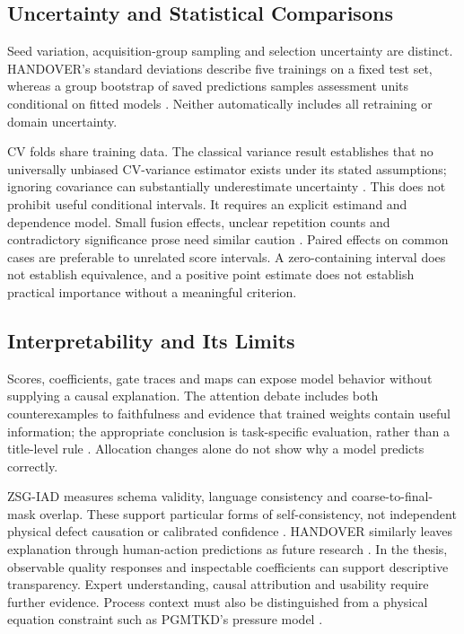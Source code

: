 \subsection{Uncertainty and Statistical Comparisons}
Seed variation, acquisition-group sampling and selection uncertainty are distinct. HANDOVER's standard deviations describe five trainings on a fixed test set, whereas a group bootstrap of saved predictions samples assessment units conditional on fitted models \citep{Thoduka2024Handover}. Neither automatically includes all retraining or domain uncertainty.

CV folds share training data. The classical variance result establishes that no universally unbiased CV-variance estimator exists under its stated assumptions; ignoring covariance can substantially underestimate uncertainty \citep[PDF pp.~8--10]{Bengio2004CVVariance}. This does not prohibit useful conditional intervals. It requires an explicit estimand and dependence model. Small fusion effects, unclear repetition counts and contradictory significance prose need similar caution \citep{Gu2024Improved,Xu2025ModalityResilient}. Paired effects on common cases are preferable to unrelated score intervals. A zero-containing interval does not establish equivalence, and a positive point estimate does not establish practical importance without a meaningful criterion.

\subsection{Interpretability and Its Limits}
Scores, coefficients, gate traces and maps can expose model behavior without supplying a causal explanation. The attention debate includes both counterexamples to faithfulness and evidence that trained weights contain useful information; the appropriate conclusion is task-specific evaluation, rather than a title-level rule \citep{P036}. Allocation changes alone do not show why a model predicts correctly.

ZSG-IAD measures schema validity, language consistency and coarse-to-final-mask overlap. These support particular forms of self-consistency, not independent physical defect causation or calibrated confidence \citep{P025}. HANDOVER similarly leaves explanation through human-action predictions as future research \citep{Thoduka2024Handover}. In the thesis, observable quality responses and inspectable coefficients can support descriptive transparency. Expert understanding, causal attribution and usability require further evidence. Process context must also be distinguished from a physical equation constraint such as PGMTKD's pressure model \citep{Li2025PGMTKD}.

